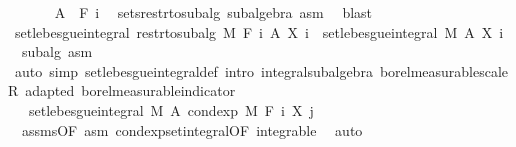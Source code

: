 \begin{isabellebody}
\ \ \ \ \isamarkupfalse%
\ {\isacharasterisk}{\kern0pt}{\isacharcolon}{\kern0pt}\ {\isachardoublequoteopen}A\ {\isasymin}\ F\ i{\isachardoublequoteclose}\ \isamarkupfalse%
\ sets{\isacharunderscore}{\kern0pt}restr{\isacharunderscore}{\kern0pt}to{\isacharunderscore}{\kern0pt}subalg\ subalgebra\ asm\ \isamarkupfalse%
\ blast\ \isanewline
\ \ \ \ \isamarkupfalse%
\ {\isachardoublequoteopen}set{\isacharunderscore}{\kern0pt}lebesgue{\isacharunderscore}{\kern0pt}integral\ {\isacharparenleft}{\kern0pt}restr{\isacharunderscore}{\kern0pt}to{\isacharunderscore}{\kern0pt}subalg\ M\ {\isacharparenleft}{\kern0pt}F\ i{\isacharparenright}{\kern0pt}{\isacharparenright}{\kern0pt}\ A\ {\isacharparenleft}{\kern0pt}X\ i{\isacharparenright}{\kern0pt}\ {\isacharequal}{\kern0pt}\ set{\isacharunderscore}{\kern0pt}lebesgue{\isacharunderscore}{\kern0pt}integral\ M\ A\ {\isacharparenleft}{\kern0pt}X\ i{\isacharparenright}{\kern0pt}{\isachardoublequoteclose}\ \isamarkupfalse%
\ {\isacharasterisk}{\kern0pt}\ subalg\ asm\ \isamarkupfalse%
\ {\isacharparenleft}{\kern0pt}auto\ simp{\isacharcolon}{\kern0pt}\ set{\isacharunderscore}{\kern0pt}lebesgue{\isacharunderscore}{\kern0pt}integral{\isacharunderscore}{\kern0pt}def\ intro{\isacharcolon}{\kern0pt}\ integral{\isacharunderscore}{\kern0pt}subalgebra{}\ borel{\isacharunderscore}{\kern0pt}measurable{\isacharunderscore}{\kern0pt}scaleR\ adapted\ borel{\isacharunderscore}{\kern0pt}measurable{\isacharunderscore}{\kern0pt}indicator{\isacharparenright}{\kern0pt}\ \isanewline
\ \ \ \ \isamarkupfalse%
\ \isamarkupfalse%
\ {\isachardoublequoteopen}{\isachardot}{\kern0pt}{\isachardot}{\kern0pt}{\isachardot}{\kern0pt}\ {\isacharequal}{\kern0pt}\ set{\isacharunderscore}{\kern0pt}lebesgue{\isacharunderscore}{\kern0pt}integral\ M\ A\ {\isacharparenleft}{\kern0pt}cond{\isacharunderscore}{\kern0pt}exp\ M\ {\isacharparenleft}{\kern0pt}F\ i{\isacharparenright}{\kern0pt}\ {\isacharparenleft}{\kern0pt}X\ j{\isacharparenright}{\kern0pt}{\isacharparenright}{\kern0pt}{\isachardoublequoteclose}\ \isamarkupfalse%
\ {\isacharasterisk}{\kern0pt}\ assms{\isacharparenleft}{\kern0pt}{}{\isacharparenright}{\kern0pt}{\isacharbrackleft}{\kern0pt}OF\ asm{\isacharbrackright}{\kern0pt}\ cond{\isacharunderscore}{\kern0pt}exp{\isacharunderscore}{\kern0pt}set{\isacharunderscore}{\kern0pt}integral{\isacharbrackleft}{\kern0pt}OF\ integrable{\isacharbrackright}{\kern0pt}\ \isamarkupfalse%
\ auto\isanewline

\end{isabellebody}
